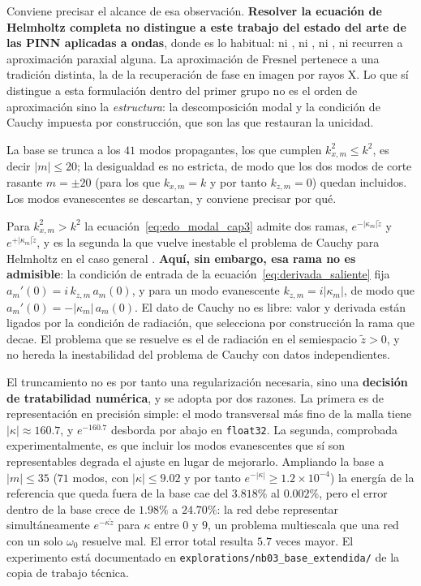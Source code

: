 Conviene precisar el alcance de esa observación. \textbf{Resolver la ecuación de
Helmholtz completa no distingue a este trabajo del estado del arte de las PINN
aplicadas a ondas}, donde es lo habitual: ni
\textcite{schoder2024helmholtz}, ni \textcite{panagiotakopoulos2026helmholtz},
ni \textcite{alkhalifah2021wavefield}, ni \textcite{zhang2025fepirbn} recurren a
aproximación paraxial alguna. La aproximación de Fresnel pertenece a una
tradición distinta, la de la recuperación de fase en imagen por rayos X. Lo que
sí distingue a esta formulación dentro del primer grupo no es el orden de
aproximación sino la \emph{estructura}: la descomposición modal y la condición
de Cauchy impuesta por construcción, que son las que restauran la unicidad.

La base se trunca a los $41$ modos propagantes, los que cumplen
$k_{x,m}^2\leq k^2$, es decir $|m|\leq20$; la desigualdad es no estricta, de
modo que los dos modos de corte rasante $m=\pm20$ (para los que $k_{x,m}=k$ y
por tanto $k_{z,m}=0$) quedan incluidos. Los modos evanescentes se descartan, y conviene precisar por qué.

Para $k_{x,m}^2>k^2$ la ecuación~\eqref{eq:edo_modal_cap3} admite dos ramas,
$e^{-|\kappa_m|\tilde z}$ y $e^{+|\kappa_m|\tilde z}$, y es la segunda la que
vuelve inestable el problema de Cauchy para Helmholtz en el caso general
\parencite{nguyen2016truncation}. \textbf{Aquí, sin embargo, esa rama no es
admisible}: la condición de entrada de la ecuación~\eqref{eq:derivada_saliente}
fija $a_m'(0)=i\,k_{z,m}\,a_m(0)$, y para un modo evanescente
$k_{z,m}=i|\kappa_m|$, de modo que $a_m'(0)=-|\kappa_m|\,a_m(0)$. El dato de
Cauchy no es libre: valor y derivada están ligados por la condición de
radiación, que selecciona por construcción la rama que decae. El problema que
se resuelve es el de radiación en el semiespacio $\tilde z>0$, y no hereda la
inestabilidad del problema de Cauchy con datos independientes.

El truncamiento no es por tanto una regularización necesaria, sino una
\textbf{decisión de tratabilidad numérica}, y se adopta por dos razones. La
primera es de representación en precisión simple: el modo transversal más fino
de la malla tiene $|\kappa|\approx160.7$, y $e^{-160.7}$ desborda por abajo en
\texttt{float32}. La segunda, comprobada experimentalmente, es que incluir los
modos evanescentes que sí son representables degrada el ajuste en lugar de
mejorarlo. Ampliando la base a $|m|\leq35$ ($71$ modos, con
$|\kappa|\leq9.02$ y por tanto $e^{-|\kappa|}\geq1.2\times10^{-4}$) la energía
de la referencia que queda fuera de la base cae del $3.818\%$ al $0.002\%$,
pero el error dentro de la base crece de $1.98\%$ a $24.70\%$: la red debe
representar simultáneamente $e^{-\kappa\tilde z}$ para $\kappa$ entre $0$ y
$9$, un problema multiescala que una red con un solo $\omega_0$ resuelve mal.
El error total resulta $5.7$ veces mayor. El experimento está documentado en
\texttt{explorations/nb03\_base\_extendida/} de la copia de trabajo técnica.


